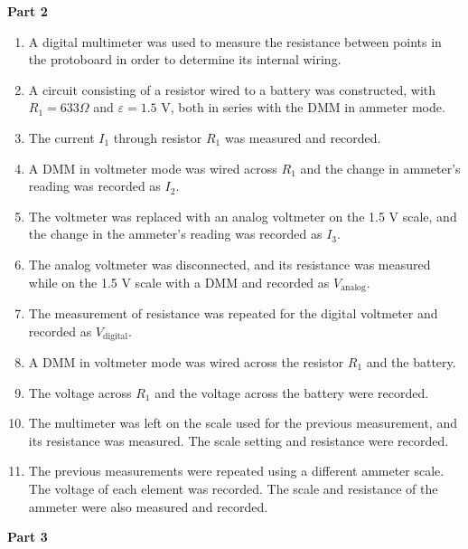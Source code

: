 \documentclass[twocolumn,english]{IEEEtran}
\theoremstyle{plain}
\theoremstyle{plain}
\begin{document}
\textbf{Part 2}
\begin{enumerate}
 \item A digital multimeter was used to measure the resistance between points in the protoboard in order to determine its internal wiring.
 \item A circuit consisting of a resistor wired to a battery was constructed, with $R_1=633 \Omega$ and $\varepsilon = 1.5$ V, both in series with the DMM in ammeter mode.
 \item The current $I_1$ through resistor $R_1$ was measured and recorded.
 \item A DMM in voltmeter mode was wired across $R_1$ and the change in ammeter's reading was recorded as $I_2$.
 \item The voltmeter was replaced with an analog voltmeter on the 1.5 V scale, and the change in the ammeter's reading was recorded as $I_3$.
 \item The analog voltmeter was disconnected, and its resistance was measured while on the 1.5 V scale with a DMM and recorded as $V_{\text{analog}}$.
 \item The measurement of resistance was repeated for the digital voltmeter and recorded as $V_{\text{digital}}$.
 \item A DMM in voltmeter mode was wired across the resistor $R_1$ and the battery.
 \item The voltage across $R_1$ and the voltage across the battery were recorded.
 \item The multimeter was left on the scale used for the previous measurement, and its resistance was measured. The scale setting and resistance were recorded.
 \item The previous measurements were repeated using a different ammeter scale. The voltage of each element was recorded. The scale and resistance of the ammeter were also measured and recorded.
\end{enumerate}

\textbf{Part 3}
\end{document}
